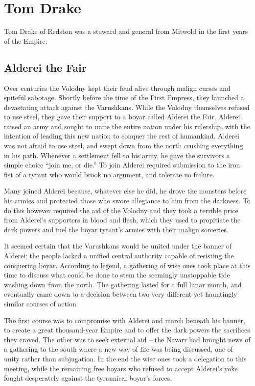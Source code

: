 \section{Tom Drake}
Tom Drake of Redston was a steward and general from Mitwold in the first years of the Empire.
\subsection{Alderei the Fair}
Over centuries the Volodny kept their feud alive through malign curses and spiteful sabotage. Shortly before the time of the First Empress, they launched a devastating attack against the Varushkans. While the Volodny themselves refused to use steel, they gave their support to a boyar called Alderei the Fair. Alderei raised an army and sought to unite the entire nation under his rulership, with the intention of leading this new nation to conquer the rest of humankind. Alderei was not afraid to use steel, and swept down from the north crushing everything in his path. Whenever a settlement fell to his army, he gave the survivors a simple choice “join me, or die.” To join Alderei required submission to the iron fist of a tyrant who would brook no argument, and tolerate no failure.

Many joined Alderei because, whatever else he did, he drove the monsters before his armies and protected those who swore allegiance to him from the darkness. To do this however required the aid of the Volodny and they took a terrible price from Alderei’s supporters in blood and flesh, which they used to propitiate the dark powers and fuel the boyar tyrant's armies with their malign sorceries.

It seemed certain that the Varushkans would be united under the banner of Alderei; the people lacked a unified central authority capable of resisting the conquering boyar. According to legend, a gathering of wise ones took place at this time to discuss what could be done to stem the seemingly unstoppable tide washing down from the north. The gathering lasted for a full lunar month, and eventually came down to a decision between two very different yet hauntingly similar courses of action.

The first course was to compromise with Alderei and march beneath his banner, to create a great thousand-year Empire and to offer the dark powers the sacrifices they craved. The other was to seek external aid – the Navarr had brought news of a gathering to the south where a new way of life was being discussed, one of unity rather than subjugation. In the end the wise ones took a delegation to this meeting, while the remaining free boyars who refused to accept Alderei’s yoke fought desperately against the tyrannical boyar's forces.

